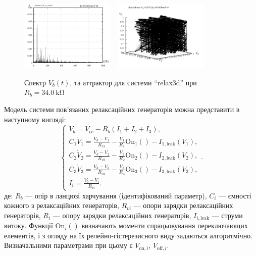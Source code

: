 \documentclass[a4paper,13pt]{atuaref}
\begin{document}
\begin{figure}[htb!]
  \centerline{
    \includegraphics[width=0.40\textwidth]{p7/p/relax3d_f_08.png}
    ~
    \includegraphics[width=0.40\textwidth]{p7/p/relax3d_v1v2v3_08.png}
  }
  \caption{Спектр $V_b(t)$, та аттрактор для системи ``relax3d'' при $R_b=\SI{34.0}{\kilo\ohm}$ }
  \label{atu:f:relax3d_f_08}
\end{figure}

Модель системи пов'язаних релаксаційних генераторів можна представити в наступному вигляді:
%
\begin{equation}
  \begin{cases}
    V_b = V_{cc} - R_b ( I_1 + I_2 + I_3 ), \\
      C_1 \dot{V}_1 = \frac{V_b-V_1}{R_{v1}} - \frac{V_1}{R_1} \mathrm{On}_1() - I_{1,\mathrm{leak}}(V_1), \\
      C_2 \dot{V}_2 = \frac{V_b-V_2}{R_{v2}} - \frac{V_2}{R_2} \mathrm{On}_2() - I_{2,\mathrm{leak}}(V_2), \\
      C_3 \dot{V}_3 = \frac{V_b-V_3}{R_{v3}} - \frac{V_3}{R_3} \mathrm{On}_3() - I_{3,\mathrm{leak}}(V_3), \\
      I_i = \frac{V_b-V_i}{R_{vi}}.
  \end{cases}.
    \label{atu:eq:relax3}
\end{equation}
%
де:
$R_b$ --- опір в ланцюзі харчування (ідентифікований параметр),
$C_i$ --- ємності кожного з релаксаційних генераторів,
$R_{vi}$ --- опори зарядки релаксаційних генераторів,
$R_{i}$ --- опору зарядки релаксаційних генераторів,
$I_{i,\mathrm{leak}}$ --- струми витоку.
Функції $\mathrm{On}_i() $ визначають моменти спрацьовування переключающих
елементів, і з огляду на їх релейно-гістерезисного виду задаються алгоритмічно.
Визначальними параметрами при цьому є
$V_{\mathrm{on},i}$, $V_{\mathrm{off},i}$.
\end{document}
